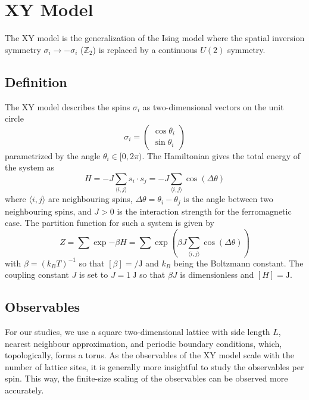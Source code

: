\section{XY Model}\label{sec:theo:xy_model}
	The XY model is the generalization of the Ising model where the spatial inversion symmetry $\sigma_i \rightarrow -\sigma_i$ ($\mathbb{Z}_2$) is replaced by a continuous $U(2)$ symmetry.
	
	\subsection{Definition}
		The XY model describes the spins $\sigma_i$ as two-dimensional vectors on the unit circle
		\begin{equation}\label{eq:hamiltonian}
			\sigma_i = \begin{pmatrix}
				\cos{\theta_i} \\ \sin{\theta_i}
			\end{pmatrix}
		\end{equation}
		parametrized by the angle $\theta_i \in [0,2\pi)$. The Hamiltonian gives the total energy of the system as
		\begin{equation}
			H = -J \sum_{\langle i, j \rangle}{s_i \cdot s_j} = -J \sum_{\langle i, j \rangle}{\cos(\Delta \theta)}
		\end{equation}
		where $\langle i,j \rangle$ are neighbouring spins, $\Delta \theta = \theta_i - \theta_j$ is the angle between two neighbouring spins, and $J>0$ is the interaction strength for the ferromagnetic case. The partition function for such a system is given by
		\begin{equation}
			Z = \sum{\exp{-\beta H}} = \sum{\exp{ \left( \beta J \sum_{\langle i, j \rangle}{\cos(\Delta \theta)} \right) }}
		\end{equation}
		with $\beta = (k_B T)^{-1}$ so that $[\beta] = \si{\per\joule}$ and $k_B$ being the Boltzmann constant. The coupling constant $J$ is set to $J = \SI{1}{\joule}$ so that $\beta J$ is dimensionless and $[H] = \si{\joule}$. 
		
	\subsection{Observables}
		For our studies, we use a square two-dimensional lattice with side length $L$, nearest neighbour approximation, and periodic boundary conditions, which, topologically, forms a torus. As the observables of the XY model scale with the number of lattice sites, it is generally more insightful to study the observables per spin. This way, the finite-size scaling of the observables can be observed more accurately.
	

